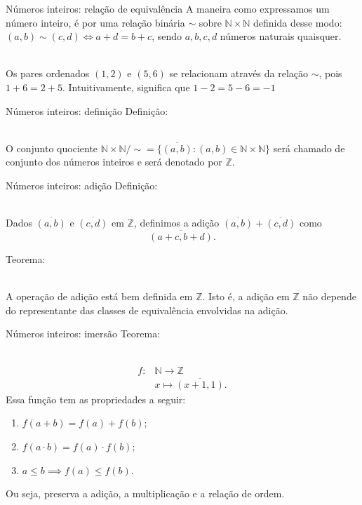 \documentclass[xcolor=dvipsnames]{beamer}
\begin{document}
\begin{frame}{Números inteiros: relação de equivalência}
    A maneira como expressamos um número inteiro, é por uma relação binária $\sim$ sobre $\mathbb{N} \times \mathbb{N}$ definida desse modo: $(a,b) \sim (c,d) \iff a+d = b+c$, sendo $a,b,c,d$ números naturais quaisquer.\\~\ 

    
    Os pares ordenados $(1,2)$ e $(5,6)$ se relacionam através da relação $\sim$, pois $1+6 = 2+5$.   
    Intuitivamente, significa que $1 - 2 = 5 - 6 = -1$
\end{frame}
\begin{frame}{Números inteiros: definição}
    Definição: \\~\
    
    O conjunto quociente $\mathbb{N} \times \mathbb{N} / \sim = \{ \overline{(a,b)}: (a,b) \in \mathbb{N} \times \mathbb{N}\}$ será chamado de conjunto dos números inteiros e será denotado por $\mathbb{Z}$.
\end{frame}

\begin{frame}{Números inteiros: adição}
    Definição: \\~\
    
    Dados $\overline{(a,b)}$ e $\overline{(c,d)}$ em $\mathbb{Z}$, definimos a adição $\overline{(a,b)} + \overline{(c,d)}$ como 
    \[\overline{(a+c, b+d)}. \]

    Teorema: \\~\
    
    A operação de adição está bem definida em $\mathbb{Z}$. Isto é, a adição em $\mathbb{Z}$ não depende do representante das classes de equivalência envolvidas na adição.
\end{frame}

\begin{frame}{Números inteiros: imersão}
    Teorema: \\~\
    
    \begin{align*}
        f \colon &\mathbb{N} \to \mathbb{Z} \\
        &x \mapsto \overline{(x+1, 1)}.
    \end{align*}
    Essa função tem as propriedades a seguir:
    \begin{enumerate}
        \item $f(a + b) = f(a) + f(b)$;
        \item $f(a \cdot b) = f(a) \cdot f(b)$;
        \item $a \leq b \implies f(a) \leq f(b)$.
    \end{enumerate}
    Ou seja, preserva a adição, a multiplicação e a relação de ordem.
\end{frame}
\end{document}
